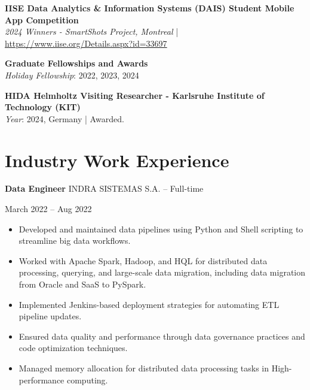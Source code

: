 \documentclass[10pt, letterpaper]{article}
\newenvironment{highlights}{
    \begin{itemize}[
        topsep=0.10 cm,
        parsep=0.10 cm,
        partopsep=0pt,
        itemsep=0pt,
        leftmargin=0 cm + 10pt
    ]
}{
    \end{itemize}
} %
\newenvironment{twocolentry}[2][]{
    \onecolentry
    \def\secondColumn{#2}
    \setcolumnwidth{\fill, 4.5 cm}
    \begin{paracol}{2}
}{
    \switchcolumn \raggedleft \secondColumn
    \end{paracol}
    \endonecolentry
} %
\begin{document}
     
    \noindent \textbf{IISE Data Analytics \& Information Systems (DAIS) Student Mobile App Competition} \\
    \textit{2024 Winners - SmartShots Project, Montreal} | \url{https://www.iise.org/Details.aspx?id=33697}\\
    
    
 
    \vspace{0.5em} %
    
    \noindent \textbf{Graduate Fellowships and Awards} \\
    \textit{Holiday Fellowship}: 2022, 2023, 2024 \\
    
    \vspace{0.5em} %


    
    \noindent \textbf{HIDA Helmholtz Visiting Researcher - Karlsruhe Institute of Technology (KIT)} \\
    \textit{Year}: 2024, Germany | Awarded.




        
\section*{Industry Work Experience}
\small

\begin{twocolentry}{March 2022 – Aug 2022}
    \textbf{Data Engineer}  \textbar INDRA SISTEMAS S.A. – Full-time
\end{twocolentry}
\begin{highlights}
    \item Developed and maintained data pipelines using Python and Shell scripting to streamline big data workflows.
    \item Worked with Apache Spark, Hadoop, and HQL for distributed data processing, querying, and large-scale data migration, including data migration from Oracle and SaaS to PySpark.
    \item Implemented Jenkins-based deployment strategies for automating ETL pipeline updates.
    \item Ensured data quality and performance through data governance practices and code optimization techniques.
    \item Managed memory allocation for distributed data processing tasks in High-performance computing.
\end{highlights}
\vspace{0.3cm}
\end{document}
